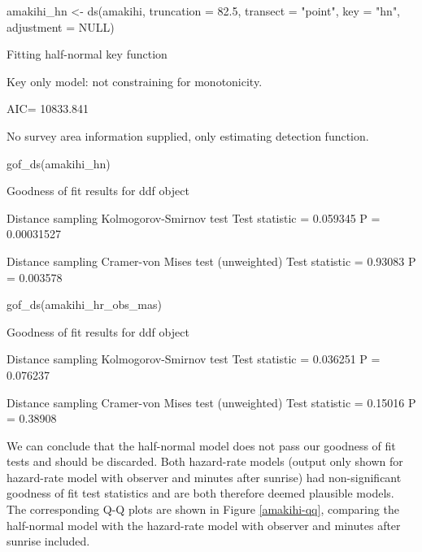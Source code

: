 \documentclass[article]{jss}
\begin{document}
\begin{CodeChunk}
\begin{CodeInput}
amakihi_hn <- ds(amakihi, truncation = 82.5, transect = "point",
                 key = "hn", adjustment = NULL)
\end{CodeInput}
\begin{CodeOutput}
Fitting half-normal key function
\end{CodeOutput}
\begin{CodeOutput}
Key only model: not constraining for monotonicity.
\end{CodeOutput}
\begin{CodeOutput}
AIC= 10833.841
\end{CodeOutput}
\begin{CodeOutput}
No survey area information supplied, only estimating detection function.
\end{CodeOutput}
\begin{CodeInput}
gof_ds(amakihi_hn)
\end{CodeInput}
\begin{CodeOutput}

Goodness of fit results for ddf object

Distance sampling Kolmogorov-Smirnov test
Test statistic =  0.059345  P =  0.00031527 

Distance sampling Cramer-von Mises test (unweighted)
Test statistic =  0.93083  P =  0.003578 
\end{CodeOutput}
\begin{CodeInput}
gof_ds(amakihi_hr_obs_mas)
\end{CodeInput}
\begin{CodeOutput}

Goodness of fit results for ddf object

Distance sampling Kolmogorov-Smirnov test
Test statistic =  0.036251  P =  0.076237 

Distance sampling Cramer-von Mises test (unweighted)
Test statistic =  0.15016  P =  0.38908 
\end{CodeOutput}
\end{CodeChunk}

We can conclude that the half-normal model does not pass our goodness of
fit tests and should be discarded. Both hazard-rate models (output only
shown for hazard-rate model with observer and minutes after sunrise) had
non-significant goodness of fit test statistics and are both therefore
deemed plausible models. The corresponding Q-Q plots are shown in Figure
\ref{amakihi-qq}, comparing the half-normal model with the hazard-rate
model with observer and minutes after sunrise included.
\end{document}
